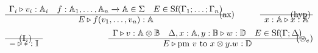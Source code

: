 \begin{figure} [H]
  \small{
\begin{equation*}
\begin{split}
\begin{aligned}
& \hspace{-20pt}
\begin{minipage}[t]{0.3\textwidth}
$\begin{array}{c}
     \Gamma_{i} \triangleright v_{i}: \mathbb{A}_{i} \quad f: \mathbb{A}_{1}, \ldots, \mathbb{A}_{n} \xrightarrow{} \mathbb{A} \in \Sigma \quad E \in \text{Sf}(\Gamma_{1}; \ldots; \Gamma_{n})\\
    \hline
   E \triangleright f( v_{1},\ldots,v_{n}): \mathbb{A}
\end{array}
$
\end{minipage}
\hspace{148pt}
\text{(ax)} 
 \hspace{30pt}
\begin{minipage}[t]{0.3\textwidth}
$\begin{array}{c}
      \\
    \hline
   x:\mathbb{A} \triangleright x:\mathbb{A}
\end{array}
$ \end{minipage}
\hspace{-68pt} \text{(hyp)} \\
& \hspace{-20pt}
\begin{minipage}[t]{0.3\textwidth}
$\begin{array}{c}
    \\
    \hline
   - \triangleright *: \mathbb{I}
\end{array}
$
\end{minipage}
\hspace{-87pt}
\text{($\mathbb{I}_{i}$)} 
 \hspace{90pt}
\begin{minipage}[t]{0.3\textwidth}
$\begin{array}{c}
     \Gamma \triangleright v: \mathbb{A} \otimes \mathbb{B} \quad  \Delta,x: \mathbb{A}, y: \mathbb{B}  \triangleright w: \mathbb{D}  \quad E \in \text{Sf}(\Gamma;\Delta)\\
    \hline
   E\triangleright \text{pm } v \text{ to } x \otimes y. w :\mathbb{D}
\end{array}
$ \end{minipage}
\hspace{117pt} (\otimes_{e}) \\
& \hspace{-20pt}

\end{aligned}
\end{split}
\end{equation*}}
\end{figure}
